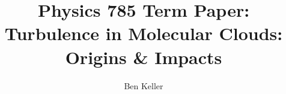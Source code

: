 \documentclass[12pt]{article}
\begin{document}
\title{Physics 785 Term Paper: Turbulence in Molecular Clouds: Origins \&
Impacts}
\author{Ben Keller}
\maketitle
\newpage
\end{document}
